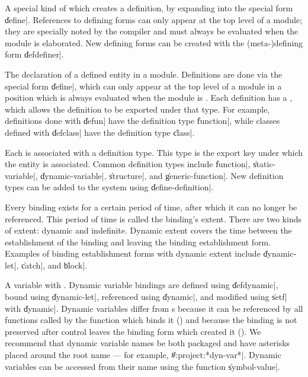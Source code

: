 \begin{description}
	{A special kind of  which creates a definition, by
	expanding into the special form \|define|.  References to
	defining forms can only appear at the top level of a module;
	they are specially noted by the compiler and must always be
	evaluated when the module is elaborated.  New defining forms
	can be created with the (meta-)defining form \|defdefiner|.}

	{The declaration of a defined entity in a module.  Definitions
	are done via the special form \|define|, which can only appear
	at the top level of a module in a position which is always
	evaluated when the module is .  Each
	definition has a , which allows the
	definition to be exported under that type.  For example,
	definitions done with \|defun| have the definition type
	\|function|, while classes defined with \|defclass| have the
	definition type \|class|.}

	{Each  is associated with a definition type.
	This type is the export key under which the entity is
	associated.  Common definition types include \|function|,
	\|static-variable|, \|dynamic-variable|, \|structure|, and
	\|generic-function|.  New definition types can be added to the
	system using \|define-definition|.}

	{Every binding exists for a certain period of time, after
	which it can no longer be referenced.  This period of time is
	called the binding's extent.  There are two kinds of extent:
	dynamic and indefinite.  Dynamic extent covers the time
	between the establishment of the binding and leaving the
	binding establishment form.  Examples of binding establishment
	forms with dynamic extent include \|dynamic-let|, \|catch|,
	and \|block|.}

	{A variable with .  Dynamic variable
	bindings are defined using \|defdynamic|, bound using
	\|dynamic-let|, referenced using \|dynamic|, and modified
	using \|setf| with \|dynamic|.  Dynamic variables differ from
	s because it can be referenced by all
	functions called by the function which binds it () and because the binding is not preserved after control
	leaves the binding form which created it ().  We recommend that dynamic variable names be both
	packaged and have asterisks placed around the root name ---
	for example, \|\#:project:*dyn-var*|.  Dynamic variables can be
	accessed from their name using the function \|symbol-value|.}


\end{description}
